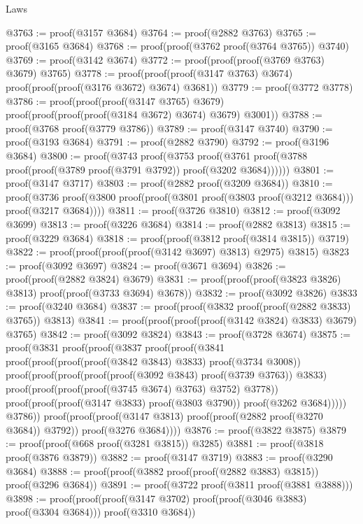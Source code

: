 \begin{lexlean}{Laws}
\begin{coremodule}
@3763 := proof(@3157 @3684)
@3764 := proof(@2882 @3763)
@3765 := proof(@3165 @3684)
@3768 := proof(proof(@3762 proof(@3764 @3765)) @3740)
@3769 := proof(@3142 @3674)
@3772 := proof(proof(proof(@3769 @3763) @3679) @3765)
@3778 := proof(proof(proof(@3147 @3763) @3674) proof(proof(proof(@3176 @3672) @3674) @3681))
@3779 := proof(@3772 @3778)
@3786 := proof(proof(proof(@3147 @3765) @3679)
      proof(proof(proof(proof(@3184 @3672) @3674) @3679) @3001))
@3788 := proof(@3768 proof(@3779 @3786))
@3789 := proof(@3147 @3740)
@3790 := proof(@3193 @3684)
@3791 := proof(@2882 @3790)
@3792 := proof(@3196 @3684)
@3800 := proof(@3743
      proof(@3753
          proof(@3761 proof(@3788 proof(proof(@3789 proof(@3791 @3792)) proof(@3202 @3684))))))
@3801 := proof(@3147 @3717)
@3803 := proof(@2882 proof(@3209 @3684))
@3810 := proof(@3736
      proof(@3800 proof(proof(@3801 proof(@3803 proof(@3212 @3684))) proof(@3217 @3684))))
@3811 := proof(@3726 @3810)
@3812 := proof(@3092 @3699)
@3813 := proof(@3226 @3684)
@3814 := proof(@2882 @3813)
@3815 := proof(@3229 @3684)
@3818 := proof(proof(@3812 proof(@3814 @3815)) @3719)
@3822 := proof(proof(proof(proof(@3142 @3697) @3813) @2975) @3815)
@3823 := proof(@3092 @3697)
@3824 := proof(@3671 @3694)
@3826 := proof(proof(@2882 @3824) @3679)
@3831 := proof(proof(proof(@3823 @3826) @3813) proof(proof(@3733 @3694) @3678))
@3832 := proof(@3092 @3826)
@3833 := proof(@3240 @3684)
@3837 := proof(proof(@3832 proof(proof(@2882 @3833) @3765)) @3813)
@3841 := proof(proof(proof(proof(@3142 @3824) @3833) @3679) @3765)
@3842 := proof(@3092 @3824)
@3843 := proof(@3728 @3674)
@3875 := proof(@3831
      proof(proof(@3837
            proof(proof(@3841
                  proof(proof(proof(proof(@3842 @3843) @3833) proof(@3734 @3008))
                      proof(proof(proof(proof(proof(@3092 @3843) proof(@3739 @3763)) @3833)
                            proof(proof(proof(proof(@3745 @3674) @3763) @3752) @3778))
                          proof(proof(proof(@3147 @3833) proof(@3803 @3790)) proof(@3262 @3684)))))
                @3786))
          proof(proof(proof(@3147 @3813) proof(proof(@2882 proof(@3270 @3684)) @3792))
              proof(@3276 @3684))))
@3876 := proof(@3822 @3875)
@3879 := proof(proof(@668 proof(@3281 @3815)) @3285)
@3881 := proof(@3818 proof(@3876 @3879))
@3882 := proof(@3147 @3719)
@3883 := proof(@3290 @3684)
@3888 := proof(proof(@3882 proof(proof(@2882 @3883) @3815)) proof(@3296 @3684))
@3891 := proof(@3722 proof(@3811 proof(@3881 @3888)))
@3898 := proof(proof(proof(@3147 @3702) proof(proof(@3046 @3883) proof(@3304 @3684)))
      proof(@3310 @3684))

\end{coremodule}
\end{lexlean}
